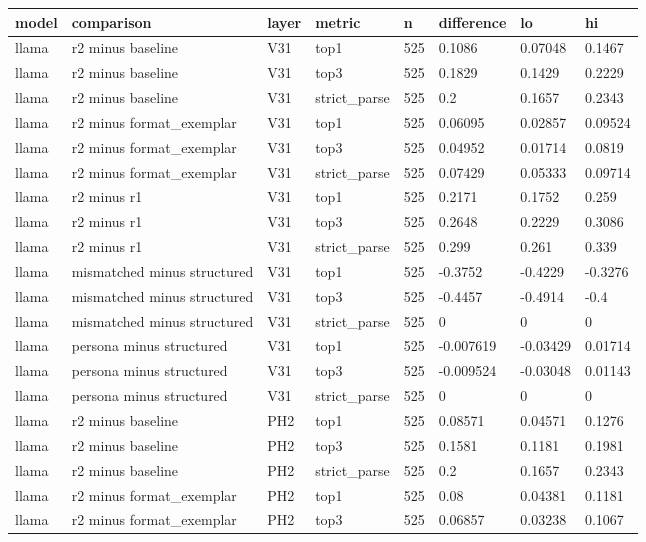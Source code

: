 \begin{tabular}{llllllll}
\toprule
model & comparison & layer & metric & n & difference & lo & hi \\
\midrule
llama & r2 minus baseline & V31 & top1 & 525 & 0.1086 & 0.07048 & 0.1467 \\
llama & r2 minus baseline & V31 & top3 & 525 & 0.1829 & 0.1429 & 0.2229 \\
llama & r2 minus baseline & V31 & strict\_parse & 525 & 0.2 & 0.1657 & 0.2343 \\
llama & r2 minus format\_exemplar & V31 & top1 & 525 & 0.06095 & 0.02857 & 0.09524 \\
llama & r2 minus format\_exemplar & V31 & top3 & 525 & 0.04952 & 0.01714 & 0.0819 \\
llama & r2 minus format\_exemplar & V31 & strict\_parse & 525 & 0.07429 & 0.05333 & 0.09714 \\
llama & r2 minus r1 & V31 & top1 & 525 & 0.2171 & 0.1752 & 0.259 \\
llama & r2 minus r1 & V31 & top3 & 525 & 0.2648 & 0.2229 & 0.3086 \\
llama & r2 minus r1 & V31 & strict\_parse & 525 & 0.299 & 0.261 & 0.339 \\
llama & mismatched minus structured & V31 & top1 & 525 & -0.3752 & -0.4229 & -0.3276 \\
llama & mismatched minus structured & V31 & top3 & 525 & -0.4457 & -0.4914 & -0.4 \\
llama & mismatched minus structured & V31 & strict\_parse & 525 & 0 & 0 & 0 \\
llama & persona minus structured & V31 & top1 & 525 & -0.007619 & -0.03429 & 0.01714 \\
llama & persona minus structured & V31 & top3 & 525 & -0.009524 & -0.03048 & 0.01143 \\
llama & persona minus structured & V31 & strict\_parse & 525 & 0 & 0 & 0 \\
llama & r2 minus baseline & PH2 & top1 & 525 & 0.08571 & 0.04571 & 0.1276 \\
llama & r2 minus baseline & PH2 & top3 & 525 & 0.1581 & 0.1181 & 0.1981 \\
llama & r2 minus baseline & PH2 & strict\_parse & 525 & 0.2 & 0.1657 & 0.2343 \\
llama & r2 minus format\_exemplar & PH2 & top1 & 525 & 0.08 & 0.04381 & 0.1181 \\
llama & r2 minus format\_exemplar & PH2 & top3 & 525 & 0.06857 & 0.03238 & 0.1067 \\

\end{tabular}
